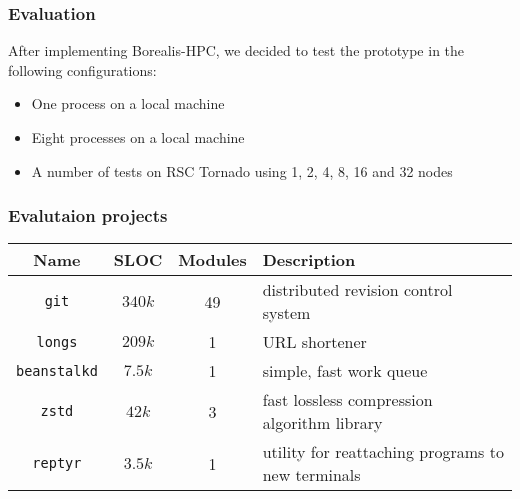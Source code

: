 
\begin{frame}
\frametitle{Evaluation}
After implementing Borealis-HPC, we decided to test the prototype in the following configurations:
	\begin{itemize}
		\item One process on a local machine
		\item Eight processes on a local machine
		\item A number of tests on RSC Tornado using 1, 2, 4, 8, 16 and 32 nodes
	\end{itemize}
\end{frame}


\begin{frame}
\frametitle{Evalutaion projects}
\begin{table}[tbh]
\centering
\label{table:projects}
\begin{adjustbox}{max width=\textwidth}
\begin{tabular}{|c|c|c|l|}
\hline
Name & SLOC & Modules & Description \\ \hline
\texttt{git} & $340k$ & 49 & distributed revision control system \\ \hline
\texttt{longs} & $209k$ & 1  & URL shortener \\ \hline
\texttt{beanstalkd} & $7.5k$ & 1  & simple, fast work queue \\ \hline
\texttt{zstd} & $42k$  & 3  & fast lossless compression algorithm library \\ \hline
\texttt{reptyr} & $3.5k$ & 1  & utility for reattaching programs to new terminals \\ \hline
\end{tabular}
\end{adjustbox}
\end{table}
\end{frame}


